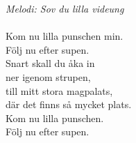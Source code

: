 {\footnotesize\textit{Melodi: Sov du lilla videung}}\\
\\
Kom nu lilla punschen min.\\
Följ nu efter supen. \\
Snart skall du åka in\\
ner igenom strupen,\\
till mitt stora magpalats,\\
där det finns så mycket plats.\\
Kom nu lilla punschen.\\
Följ nu efter supen.
